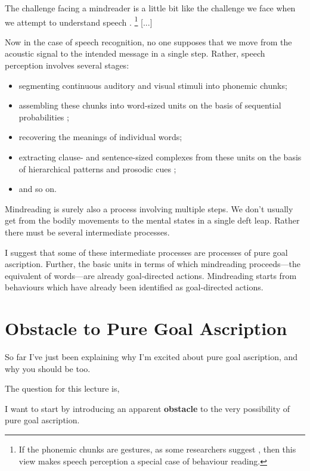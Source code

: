 \documentclass[12pt,\papersize]{extarticle}
\begin{document}
The challenge facing a mindreader is a little bit like the challenge we face when we attempt to understand speech \citep{Baird:2001mb,Baldwin:2001rs}.%
\footnote{
	If the phonemic chunks are gestures, as some researchers suggest \citep[]{Browman:1992da, Liberman:2000gr}, then this view makes speech perception a special case of behaviour reading.}
[...]

Now in the case of speech recognition, no one supposes that we move from the acoustic signal to the intended message in a single step.
Rather, speech perception involves several stages: 
\begin{itemize}
\item 
segmenting continuous auditory and visual stimuli into phonemic chunks; 
\item 
assembling these chunks into word-sized units on the basis of sequential probabilities \citep[]{Saffran:1996aj}; 
\item 
recovering the meanings of individual words;
\item
 extracting clause- and sentence-sized complexes from these units on the basis of hierarchical patterns and prosodic cues \citep[]{Newport:2004wi, Soderstrom:2005zy}; 
\item
and so on.
\end{itemize}


Mindreading is surely also a process involving multiple steps.
We don't usually get from the bodily movements to the mental states in a single deft leap.
Rather there must be several intermediate processes.

I suggest that some of these intermediate processes are processes of pure goal ascription. 
Further, the basic units in terms of which mindreading proceeds---the equivalent of words---are already goal-directed actions.
Mindreading starts from behaviours which have already been identified as goal-directed actions.






\section{Obstacle to Pure Goal Ascription}
So far I've just been explaining why I'm excited about pure goal ascription, and why you should be too.

The question for this lecture is, 
\theQuestion

I want to start by introducing an apparent \textbf{obstacle} to the very possibility of pure goal ascription.
\end{document}
